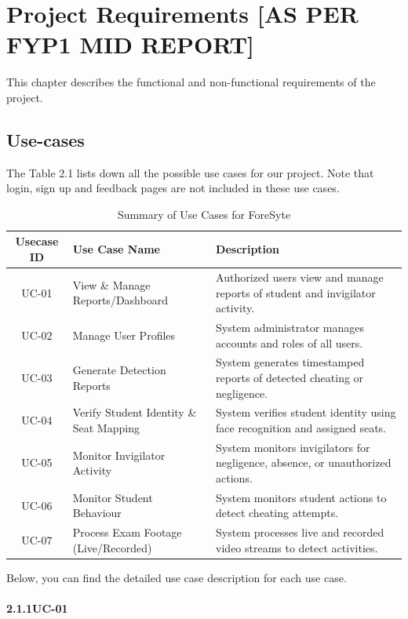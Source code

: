 \chapter{Project Requirements [AS PER FYP1 MID REPORT]}
This chapter describes the functional and non-functional requirements of the project. 
\section{Use-cases}
The Table 2.1 lists down all the possible use cases for our project. 
Note that login, sign up and feedback pages are not included in these use cases.
\begin{table}[htbp]
\caption{Summary of Use Cases for ForeSyte}
\centering
\begin{tabular}{|c|p{4cm}|p{8cm}|}
\hline
\textbf{Usecase ID} & \textbf{Use Case Name} & \textbf{Description} \\ \hline
UC-01 & View \& Manage Reports/Dashboard & Authorized users view and manage reports of student and invigilator activity. \\ \hline
UC-02 & Manage User Profiles & System administrator manages accounts and roles of all users. \\ \hline
UC-03 & Generate Detection Reports & System generates timestamped reports of detected cheating or negligence. \\ \hline
UC-04 & Verify Student Identity \& Seat Mapping & System verifies student identity using face recognition and assigned seats. \\ \hline
UC-05 & Monitor Invigilator Activity & System monitors invigilators for negligence, absence, or unauthorized actions. \\ \hline
UC-06 & Monitor Student Behaviour & System monitors student actions to detect cheating attempts. \\ \hline
UC-07 & Process Exam Footage (Live/Recorded) & System processes live and recorded video streams to detect activities. \\ \hline
\end{tabular}
\end{table}
\vspace{0.5cm} %

  Below, you can find the detailed use case description for each use case.
\clearpage

\subsubsection*{2.1.1\quad UC-01}

